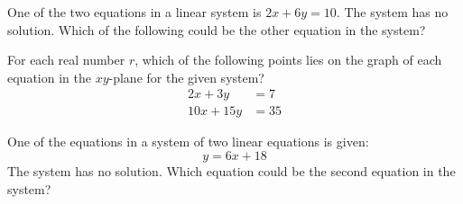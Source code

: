 \vspace{0.75em}


\vspace{2em}
\noindent\markforreview

\vspace{1em}

One of the two equations in a linear system is \( 2x + 6y = 10 \). The system has no solution. Which of the following could be the other equation in the system?

\vspace{0.75em}


\newpage
\noindent\markforreview

\vspace{1em}

For each real number \( r \), which of the following points lies on the graph of each equation in the \( xy \)-plane for the given system?
\[
\begin{aligned}
2x + 3y &= 7 \\
10x + 15y &= 35
\end{aligned}
\]

\vspace{0.75em}



\vspace{2em}

\noindent\markforreview

\vspace{1em}

One of the equations in a system of two linear equations is given:
\[
y = 6x + 18
\]
The system has no solution. Which equation could be the second equation in the system?

\vspace{0.75em}



\newpage 
\noindent\markforreview

